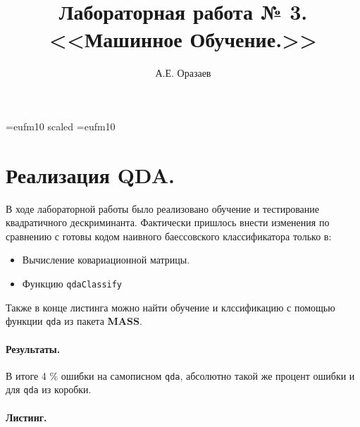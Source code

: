 \documentclass[12pt]{article}
\title{\bf Лабораторная работа № 3. \\ <<Машинное
Обучение.>>}
\author{А.Е. Оразаев}
\date{}
\begin{document}
\voffset=-20mm
\hoffset=-12mm
\font\Got=eufm10 scaled \font\Got=eufm10

\maketitle

\section{Реализация QDA.}
В ходе лабораторной работы было реализовано обучение и тестирование
квадратичного дескриминанта. Фактически пришлось внести изменения по
сравнению с готовы кодом наивного баессовского классификатора только в:
\begin{itemize}
    \item Вычисление ковариационной матрицы.
    \item Функцию \verb=qdaClassify=
\end{itemize}

Также в конце листинга можно найти обучение и клссификацию с помощью
функции \verb=qda= из пакета \textbf{MASS}.

\paragraph{Результаты.}
В итоге 4 \% ошибки на самописном \verb=qda=, абсолютно такой же
процент ошибки и для \verb=qda= из коробки.


\paragraph{Листинг.}
\begingroup
    \fontsize{10pt}{12pt}\selectfont
    
\endgroup
\end{document}
